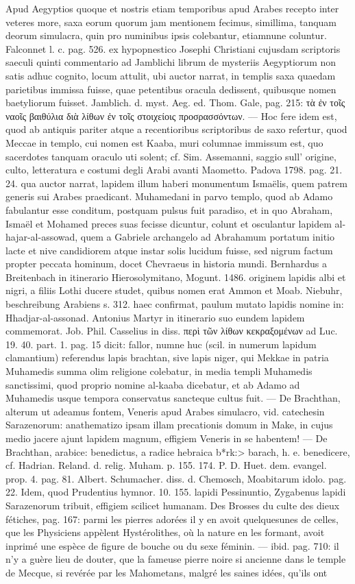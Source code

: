 \documentclass[a4paper, 11pt, oneside, polutonikogreek, german]{article}
\begin{document}
Apud Aegyptios quoque et nostris etiam temporibus apud Arabes recepto inter veteres more, saxa eorum quorum jam mentionem fecimus, simillima, tanquam deorum simulacra, quin pro numinibus ipsis colebantur, etiamnune coluntur. Falconnet l. c. pag. 526. ex hypopnestico Josephi Christiani cujusdam scriptoris saeculi quinti commentario ad Jamblichi librum de mysteriis Aegyptiorum non satis adhuc cognito, locum attulit, ubi auctor narrat, in templis saxa quaedam parietibus immissa fuisse, quae petentibus oracula dedissent, quibusque nomen baetyliorum fuisset. Jamblich. d. myst. Aeg. ed. Thom. Gale, pag. 215: τὰ ἐν τοῖς ναοῖς βαιθύλια διὰ λίθων ἐν τοῖς στοιχείοις προσρασσόντων. --- Hoc fere idem est, quod ab antiquis pariter atque a recentioribus scriptoribus de saxo refertur, quod Meccae in templo, cui nomen est Kaaba, muri columnae immissum est, quo sacerdotes tanquam oraculo uti solent; cf. Sim. Assemanni, saggio sull' origine, culto, letteratura e costumi degli Arabi avanti Maometto. Padova 1798. pag. 21. 24. qua auctor narrat, lapidem illum haberi monumentum Ismaëlis, quem patrem generis sui Arabes praedicant. Muhamedani in parvo templo, quod ab Adamo fabulantur esse conditum, postquam pulsus fuit paradiso, et in quo Abraham, Ismaël et Mohamed preces suas fecisse dicuntur, colunt et osculantur lapidem al-hajar-al-assowad, quem a Gabriele archangelo ad Abrahamum portatum initio lacte et nive candidiorem atque instar solis lucidum fuisse, sed nigrum factum propter peccata hominum, docet Chevraeus in historia mundi. Bernhardus a Breitenbach in itinerario Hierosolymitano, Mogunt. 1486. originem lapidis albi et nigri, a filiis Lothi ducere studet, quibus nomen erat Ammon et Moab. Niebuhr, beschreibung Arabiens s. 312. haec confirmat, paulum mutato lapidis nomine in: Hhadjar-al-assonad. Antonius Martyr in itinerario suo eundem lapidem commemorat. Job. Phil. Casselius in diss. περὶ τῶν λίθων κεκραξομένων ad Luc. 19. 40. part. 1. pag. 15 dicit: fallor, numne huc (scil. in numerum lapidum clamantium) referendus lapis brachtan, sive lapis niger, qui Mekkae in patria Muhamedis summa olim religione colebatur, in media templi Muhamedis sanctissimi, quod proprio nomine al-kaaba dicebatur, et ab Adamo ad Muhamedis usque tempora conservatus sancteque cultus fuit. --- De Brachthan, alterum ut adeamus fontem, Veneris apud Arabes simulacro, vid. catechesin Sarazenorum: anathematizo ipsam illam precationis domum in Make, in cujus medio jacere ajunt lapidem magnum, effigiem Veneris in se habentem! --- De Brachthan, arabice: benedictus, a radice hebraica \<b*rk:> barach, h. e. benedicere, cf. Hadrian. Reland. d. relig. Muham. p. 155. 174. P. D. Huet. dem. evangel. prop. 4. pag. 81. Albert. Schumacher. diss. d. Chemosch, Moabitarum idolo. pag. 22. Idem, quod Prudentius hymnor. 10. 155. lapidi Pessinuntio, Zygabenus lapidi Sarazenorum tribuit, effigiem scilicet humanam. Des Brosses du culte des dieux fétiches, pag. 167: parmi les pierres adorées il y en avoit quelquesunes de celles, que les Physiciens appèlent Hystérolithes, où la nature en les formant, avoit inprimé une espèce de figure de bouche ou du sexe féminin. --- ibid. pag. 710: il n'y a guère lieu de douter, que la fameuse pierre noire si ancienne dans le temple de Mecque, si revérée par les Mahometans, malgré les saines idées, qu'ils ont 
\end{document}
